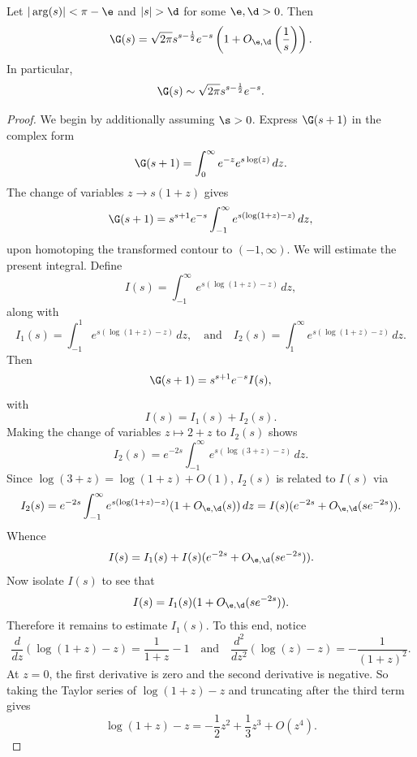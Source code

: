 \documentclass[12pt]{article}
\begin{document}
    \begin{theorem*}
      Let \(|\arg(s)| < \pi-\e\) and \(|s| > \d\) for some \(\e,\d > 0\). Then
      \[
        \G(s) = \sqrt{2\pi}s^{s-\frac{1}{2}}e^{-s}\left(1+O_{\e,\d}\left(\frac{1}{s}\right)\right).
      \]
      In particular,
      \[
        \G(s) \sim \sqrt{2\pi}s^{s-\frac{1}{2}}e^{-s}.
      \]
    \end{theorem*}
    \begin{proof}
      We begin by additionally assuming \(\s > 0\). Express \(\G(s+1)\) in the complex form
      \[
        \G(s+1) = \int_{0}^{\infty}e^{-z}e^{s\log(z)}\,dz.
      \]
      The change of variables \(z \to s(1+z)\) gives
      \[
        \G(s+1) = s^{s+1}e^{-s}\int_{-1}^{\infty}e^{s(\log(1+z)-z)}\,dz,
      \]
      upon homotoping the transformed contour to \((-1,\infty)\). We will estimate the present integral. Define
      \[
        I(s) = \int_{-1}^{\infty}e^{s(\log(1+z)-z)}\,dz,
      \]
      along with
      \[
        I_{1}(s) = \int_{-1}^{1}e^{s(\log(1+z)-z)}\,dz, \quad \text{and} \quad I_{2}(s) = \int_{1}^{\infty}e^{s(\log(1+z)-z)}\,dz.
      \]
      Then
      \begin{equation}\label{equ:Stirlings_formula_1}
        \G(s+1) = s^{s+1}e^{-s}I(s),
      \end{equation}
      with
      \[
        I(s) = I_{1}(s)+I_{2}(s).
      \]
      Making the change of variables \(z \mapsto 2+z\) to \(I_{2}(s)\) shows
      \[
        I_{2}(s) = e^{-2s}\int_{-1}^{\infty}e^{s(\log(3+z)-z)}\,dz.
      \]
      Since \(\log(3+z) = \log(1+z)+O(1)\), \(I_{2}(s)\) is related to \(I(s)\) via
      \[
        I_{2}(s) = e^{-2s}\int_{-1}^{\infty}e^{s(\log(1+z)-z)}(1+O_{\e,\d}(s))\,dz = I(s)(e^{-2s}+O_{\e,\d}(se^{-2s})).
      \]
      Whence
      \[
        I(s) = I_{1}(s)+I(s)(e^{-2s}+O_{\e,\d}(se^{-2s})).
      \]
      Now isolate \(I(s)\) to see that
      \begin{equation}\label{equ:Stirlings_formula_2}
        I(s) = I_{1}(s)(1+O_{\e,\d}(se^{-2s})).
      \end{equation}
      Therefore it remains to estimate \(I_{1}(s)\). To this end, notice
      \[
        \frac{d}{dz}(\log(1+z)-z) = \frac{1}{1+z}-1 \quad \text{and} \quad \frac{d^{2}}{dz^{2}}(\log(z)-z) = -\frac{1}{(1+z)^{2}}.
      \]
      At \(z = 0\), the first derivative is zero and the second derivative is negative. So taking the Taylor series of \(\log(1+z)-z\) and truncating after the third term gives
      \[
        \log(1+z)-z = -\frac{1}{2}z^{2}+\frac{1}{3}z^{3}+O(z^{4}).
\]
\end{proof}
\end{document}
